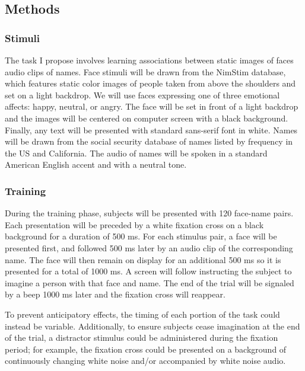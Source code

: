 \subsection*{Methods}
\subsubsection*{Stimuli}
The task I propose involves learning associations between static images of faces audio clips of names. Face stimuli will be drawn from the NimStim database, which features static color images of people taken from above the shoulders and set on a light backdrop. We will use faces expressing one of three emotional affects: happy, neutral, or angry. The face will be set in front of a light backdrop and the images will be centered on computer screen with a black background. Finally, any text will be presented with standard sans-serif font in white.  Names will be drawn from the social security database of names listed by frequency in the US and California. The audio of names will be spoken in a standard American English accent and with a neutral tone.

\subsubsection*{Training}
During the training phase, subjects will be presented with 120 face-name pairs. Each presentation will be preceded by a white fixation cross on a black background for a  duration of 500 ms. For each stimulus pair, a face will be presented first, and followed 500 ms later by an audio clip of the corresponding name. The face will then remain on display for an additional 500 ms so it is presented for a total of 1000 ms. A screen will follow instructing the subject to imagine a person with that face and name. The end of the trial will be signaled by a beep 1000 ms later and the fixation cross will reappear.

To prevent anticipatory effects, the timing of each portion of the task could instead be variable. Additionally, to ensure subjects cease imagination at the end of the trial, a distractor stimulus could be administered during the fixation period; for example, the fixation cross could be presented on a background of continuously changing white noise and/or accompanied by white noise audio. 

